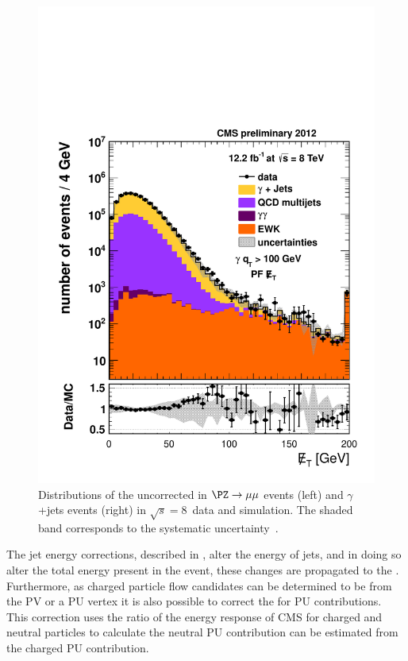 \begin{figure}
  \includegraphics[width=0.6\largefigwidth]{plots/obj/metgammajets.pdf}
  \caption{Distributions of the uncorrected \MET in $\PZ\rightarrow\mu\mu$ events (left) and $\gamma$+jets events (right) in $\sqrt{s}=8$\TeV\, data and simulation. The shaded band corresponds to the systematic uncertainty~\cite{CMS-PAS-JME-12-002}.}
  \label{fig:metresponse}
\end{figure}

The jet energy corrections, described in , alter the energy of jets, and in doing so alter the total energy present in the event, these changes are propagated to the \MET. Furthermore, as charged particle flow candidates can be determined to be from the \ac{PV} or a \ac{PU} vertex it is also possible to correct the \MET for \ac{PU} contributions. This correction uses the ratio of the energy response of CMS for charged and neutral particles to calculate the neutral \ac{PU} contribution can be estimated from the charged \ac{PU} contribution.

